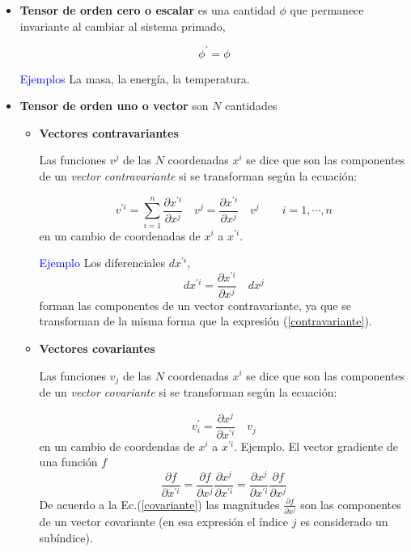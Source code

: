 \begin{itemize}
\item
\textbf{Tensor de orden cero o escalar} es una cantidad $\phi$ que permanece invariante al cambiar al sistema primado,

$$\phi^{\prime}=\phi$$

\textcolor{blue}{Ejemplos}
La masa, la energía, la temperatura.

\bigskip

 \item
\textbf{Tensor de orden uno o vector} son $N$ cantidades



\bigskip
\begin{itemize}
\item  
\textbf{Vectores contravariantes}

Las funciones $  v^{j}$   de las $N$ coordenadas $  x^{i}$  se dice que son las componentes de un \textit{vector contravariante} si se transforman según la ecuación:


\begin{equation}
v^{\prime i} = \sum^{n}_{i=1} \frac{\partial  x^{\prime i}}{\partial   x^{j}} \quad v^{j} = \frac{\partial  x^{\prime i}}{\partial   x^{j}} \quad  v^{j} \qquad i=1,\cdots,n 
\label{contravariante}
\end{equation}
en un cambio de coordenadas de $ x^{i}$  a $ x^{\prime i}$.
  
\bigskip

\textcolor{blue}{Ejemplo}  
Los diferenciales $d x^{\prime i} $,  
\[d x^{\prime i}= \frac{\partial  x^{\prime i}}{\partial   x^{j}} \quad  dx^{j}   \]
forman las componentes de un vector contravariante, ya que 
se transforman de la misma forma que la expresión (\ref{contravariante}).
\bigskip 

\item 

\textbf{Vectores covariantes}

Las funciones $  v_{j}$   de las $N$ coordenadas $  x^{i}$  se dice que son las componentes de un \textit{vector covariante} si se transforman según la ecuación:


\begin{equation}
v_i^{\prime}=\frac{\partial  x^{j}}{\partial   x^{\prime i}} \quad  v_{j}
\label{covariante}
\end{equation}
en un cambio de coordendas de $ x^{i}$  a $ x^{\prime i}$.
\bigskip
Ejemplo.
El vector gradiente de una función $f$
\begin{equation}
\frac{\partial  f }{\partial   x^{\prime i}}=\frac{\partial  f}{\partial   x^{j}} \frac{\partial  x^{j}}{\partial   x^{\prime i}}= \frac{\partial  x^{j}}{\partial   x^{\prime i}}\frac{\partial  f}{\partial   x^{j}}
\end{equation}
De acuerdo a la Ec.(\ref{covariante}) las magnitudes $  \frac{\partial  f}{\partial   x^{j}}$  son las componentes de un vector covariante (en esa expresión el índice $j$ es considerado un subíndice).




\end{itemize}
\end{itemize}

